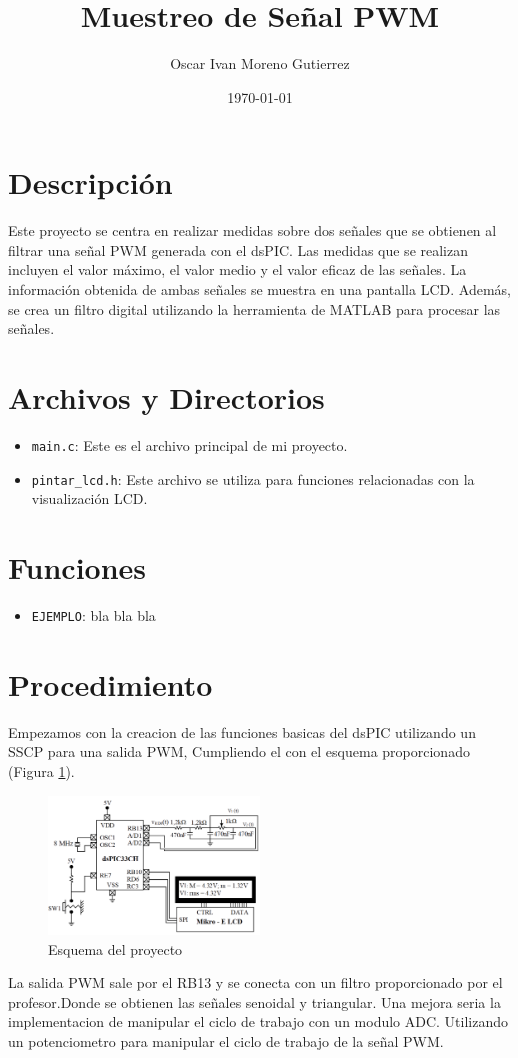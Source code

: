 \documentclass{article}
\title{Muestreo de Señal PWM}
\author{Oscar Ivan Moreno Gutierrez}
\date{\today}
\begin{document}
\maketitle

\section{Descripción}
Este proyecto se centra en realizar medidas sobre dos señales que se obtienen al filtrar una señal PWM generada con el dsPIC. Las medidas que se realizan incluyen el valor máximo, el valor medio y el valor eficaz de las señales. La información obtenida de ambas señales se muestra en una pantalla LCD. Además, se crea un filtro digital utilizando la herramienta de MATLAB para procesar las señales.
\section{Archivos y Directorios}
\begin{itemize}
\item \texttt{main.c}: Este es el archivo principal de mi proyecto.
\item \texttt{pintar\_lcd.h}: Este archivo se utiliza para funciones relacionadas con la visualización LCD.
\end{itemize}

\section{Funciones}
\begin{itemize}
\item \texttt{EJEMPLO}: bla bla bla
\end{itemize}

\section{Procedimiento}
Empezamos con la creacion de las funciones basicas del dsPIC utilizando un SSCP para una salida PWM, Cumpliendo el con el esquema proporcionado (Figura \ref{fig:esquema}).

\begin{figure}[H]
    \centering
    \includegraphics[width=0.5\textwidth]{images/esquema_og.png} %
    \caption{Esquema del proyecto}
    \label{fig:esquema}
\end{figure}
La salida PWM sale por el RB13 y se conecta con un filtro proporcionado por el profesor.Donde se obtienen las señales senoidal y triangular.
Una mejora seria la implementacion de manipular el ciclo de trabajo con un modulo ADC. Utilizando un potenciometro para manipular el ciclo de trabajo de la señal PWM.
\end{document}
